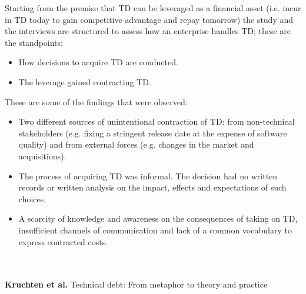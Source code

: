 Starting from the premise that TD can be leveraged as a financial asset (i.e. incur in TD today to gain competitive advantage and repay tomorrow) the study and the interviews are structured to assess how an enterprise handles TD; these are the standpoints:
\begin{itemize}
    \item How decisions to acquire TD are conducted.
    \item The leverage gained contracting TD.
\end{itemize}
These are some of the findings that were observed:
\begin{itemize}
    \item Two different sources of unintentional contraction of TD: from non-technical stakeholders (e.g. fixing a stringent release date at the expense of software quality) and from external forces (e.g. changes in the market and acquisitions).
    \item The process of acquiring TD was informal. The decision had no written records or written analysis on the impact, effects and expectations of such choices.
    \item A scarcity of knowledge and awareness on the consequences of taking on TD, insufficient channels of communication and lack of a common vocabulary to express contracted costs. 
\end{itemize}
\\
\\
\textbf{Kruchten et al.} \cite{kruchten2012technical} Technical debt: From metaphor to theory and practice

